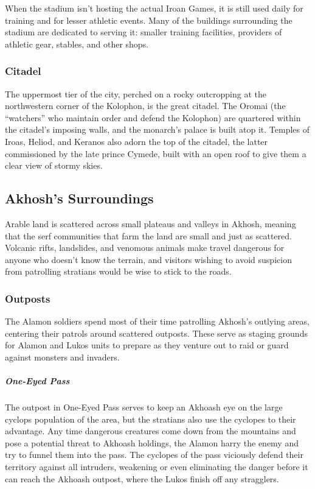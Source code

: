         When the stadium isn't hosting the actual Iroan Games, it is still used daily for training and for lesser athletic events.
        Many of the buildings surrounding the stadium are dedicated to serving it: smaller training facilities, providers of athletic gear, stables, and other shops.

    \subsubsection{Citadel}
        The uppermost tier of the city, perched on a rocky outcropping at the northwestern corner of the Kolophon, is the great citadel.
        The Oromai (the ``watchers'' who maintain order and defend the Kolophon) are quartered within the citadel's imposing walls, and the monarch's palace is built atop it.
        Temples of Iroas, Heliod, and Keranos also adorn the top of the citadel, the latter commissioned by the late prince Cymede, built with an open roof to give them a clear view of stormy skies.

\subsection*{Akhosh's Surroundings}
    Arable land is scattered across small plateaus and valleys in Akhosh, meaning that the serf communities that farm the land are small and just as scattered.
    Volcanic rifts, landslides, and venomous animals make travel dangerous for anyone who doesn't know the terrain, and visitors wishing to avoid suspicion from patrolling stratians would be wise to stick to the roads.

    \subsubsection{Outposts}
        The Alamon soldiers spend most of their time patrolling Akhosh's outlying areas, centering their patrols around scattered outposts.
        These serve as staging grounds for Alamon and Lukos units to prepare as they venture out to raid or guard against monsters and invaders.

        \subparagraph{One-Eyed Pass} The outpost in One-Eyed Pass serves to keep an Akhoash eye on the large cyclops population of the area, but the stratians also use the cyclopes to their advantage.
        Any time dangerous creatures come down from the mountains and pose a potential threat to Akhoash holdings, the Alamon harry the enemy and try to funnel them into the pass.
        The cyclopes of the pass viciously defend their territory against all intruders, weakening or even eliminating the danger before it can reach the Akhoash outpost, where the Lukos finish off any stragglers.

